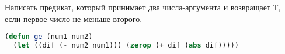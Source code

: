 Написать предикат, который принимает два числа-аргумента и возвращает Т, если
первое число не меньше второго.

\begin{lstlisting}[language=Lisp]
(defun ge (num1 num2)
  (let ((dif (- num2 num1))) (zerop (+ dif (abs dif)))))
\end{lstlisting}

